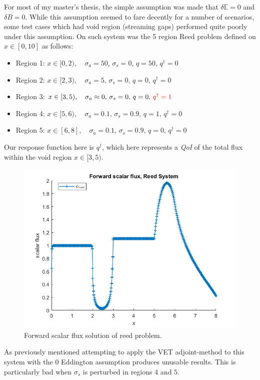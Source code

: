 \documentclass{article}
\newcommand{\Edd}{\mathbb{E}}
\newcommand{\BEdd}{B}
\newcommand{\sigs}{\sigma_s}
\newcommand{\siga}{\sigma_a}
\newcommand{\qoi}{{\it QoI}\xspace}
\newcommand{\tcr}[1]{\textcolor{red}{#1}}
\begin{document}
For most of my master's thesis, the simple assumption was made that $\delta \Edd=0$ and $\delta \BEdd=0$. While this assumption seemed to fare decently for a number of scenarios, some test cases which had void region (streaming gaps) performed quite poorly under this assumption. On such system was the 5 region Reed problem defined  on $x \in [0,10]$ as follows:
\begin{itemize}
\item Region 1: $x \in [0,2), \quad \siga=50, \, 			\sigs=0, \, q=50, \, q^\dag=0 $
\item Region 2: $x \in [2,3), \quad \siga=5, \, 			\sigs=0, \, q=0, \, q^\dag=0$ 
\item Region 3: $x \in [3,5), \quad \siga \approx 0, \,	\sigs=0, \, q=0, \,  \tcr{q^\dag=1}$
\item Region 4: $x \in [5,6), \quad \siga=0.1, \, 		\sigs=0.9, \, q=1, \, q^\dag=0$
\item Region 5: $x \in [6,8], \quad \siga=0.1, \, 		\sigs=0.9, \, q=0, \, q^\dag=0$
\end{itemize} 
Our response function here is $q^\dag$, which here represents a \qoi of the total flux within the void region $x \in [3,5)$. 
\begin{figure}[H]
\centering
  \includegraphics[width=0.6\linewidth]{phi_reed.png}
  \caption{Forward scalar flux solution of reed problem.}
\label{fig:phi_reed}
\end{figure}

As previously mentioned attempting to apply the VET adjoint-method to this system with the $0$ Eddington assumption produces unusable results. This is particularly bad when $\sigs$ is perturbed in regions $4$ and $5$.
\end{document}
